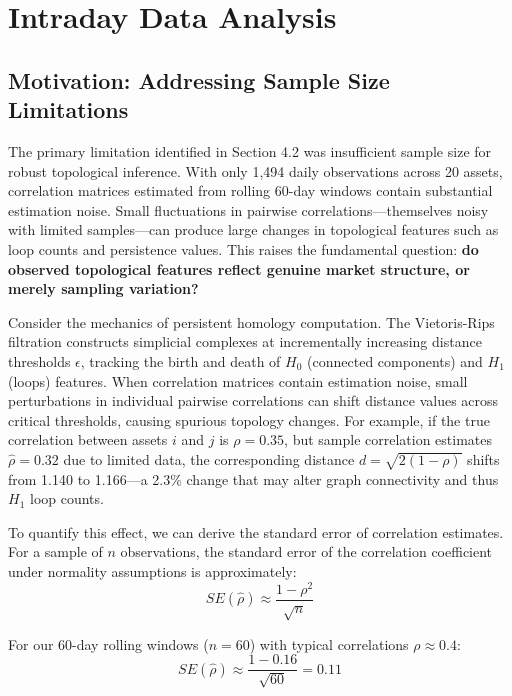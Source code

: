 \section{Intraday Data Analysis}
\label{sec:intraday}

\subsection{Motivation: Addressing Sample Size Limitations}

The primary limitation identified in Section 4.2 was insufficient sample size for robust topological inference. With only 1,494 daily observations across 20 assets, correlation matrices estimated from rolling 60-day windows contain substantial estimation noise. Small fluctuations in pairwise correlations---themselves noisy with limited samples---can produce large changes in topological features such as loop counts and persistence values. This raises the fundamental question: \textbf{do observed topological features reflect genuine market structure, or merely sampling variation?}

Consider the mechanics of persistent homology computation. The Vietoris-Rips filtration constructs simplicial complexes at incrementally increasing distance thresholds $\epsilon$, tracking the birth and death of $H_0$ (connected components) and $H_1$ (loops) features. When correlation matrices contain estimation noise, small perturbations in individual pairwise correlations can shift distance values across critical thresholds, causing spurious topology changes. For example, if the true correlation between assets $i$ and $j$ is $\rho = 0.35$, but sample correlation estimates $\hat{\rho} = 0.32$ due to limited data, the corresponding distance $d = \sqrt{2(1 - \rho)}$ shifts from 1.140 to 1.166---a 2.3\% change that may alter graph connectivity and thus $H_1$ loop counts.

To quantify this effect, we can derive the standard error of correlation estimates. For a sample of $n$ observations, the standard error of the correlation coefficient under normality assumptions is approximately:
\begin{equation}
SE(\hat{\rho}) \approx \frac{1 - \rho^2}{\sqrt{n}}
\end{equation}

For our 60-day rolling windows ($n = 60$) with typical correlations $\rho \approx 0.4$:
\begin{equation}
SE(\hat{\rho}) \approx \frac{1 - 0.16}{\sqrt{60}} = 0.11
\end{equation}

